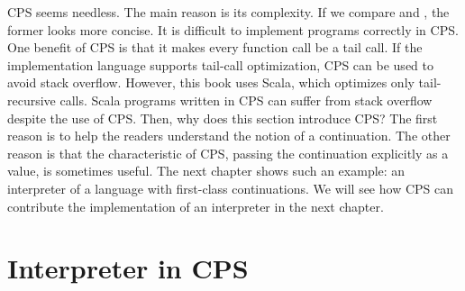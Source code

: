 


CPS seems needless. The main reason is its complexity.
If we compare  and , the former looks more concise.
It is difficult to implement programs correctly in CPS. One benefit of CPS is
that it makes every function call be a tail call. If the implementation language
supports tail-call optimization, CPS can be used to avoid stack overflow.
However, this book uses Scala, which optimizes only tail-recursive calls.
Scala programs written in CPS can suffer from stack overflow despite the use of
CPS. Then, why does this section introduce CPS? The first reason is to help the
readers understand the notion of a continuation. The other reason is that
the characteristic of CPS, passing the continuation explicitly as a value, is
sometimes useful. The next chapter shows such an example: an interpreter of a
language with first-class continuations. We will see how CPS can contribute the
implementation of an interpreter in the next chapter.

\section{Interpreter in CPS}

